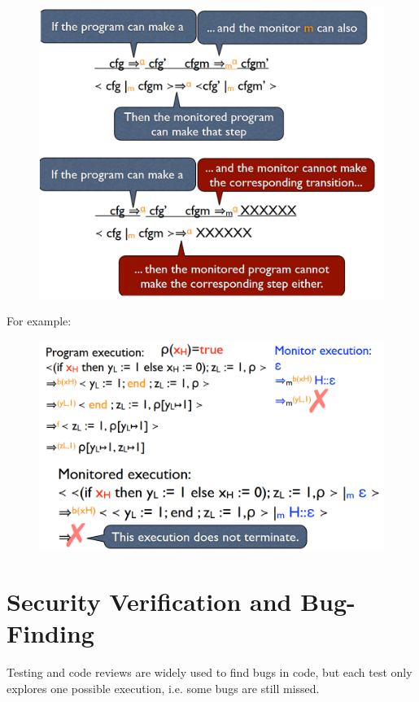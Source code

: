 \documentclass[10pt,a4paper]{report}
\begin{document}
\begin{figure}[H]
\centering
\includegraphics[scale=0.4]{35.png}
\end{figure}
For example:
\begin{figure}[H]
\centering
\includegraphics[scale=0.4]{36.png}
\end{figure}

\section{Security Verification and Bug-Finding}
Testing and code reviews are widely used to find bugs in code, but each test only explores one possible execution, i.e. some bugs are still missed.
\end{document}
